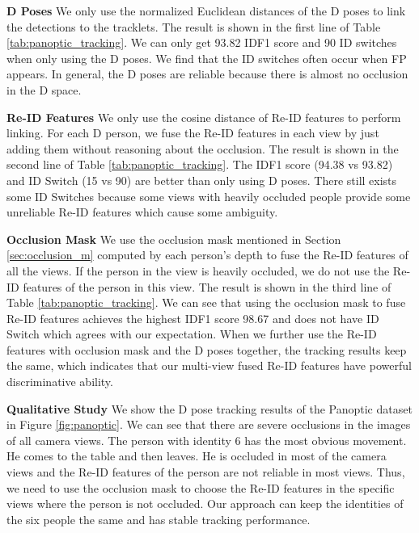 \vspace{0.5em}
\noindent
\textbf{D Poses }
We only use the normalized Euclidean distances of the D poses to link the detections to the tracklets. The result is shown in the first line of Table \ref{tab:panoptic_tracking}. We can only get 93.82 IDF1 score and 90 ID switches when only using the D poses. We find that the ID switches often occur when FP appears. In general, the D poses are reliable because there is almost no occlusion in the D space.   

\vspace{0.5em}
\noindent
\textbf{Re-ID Features }
We only use the cosine distance of Re-ID features to perform linking. For each D person, we fuse the Re-ID features in each view by just adding them without reasoning about the occlusion. The result is shown in the second line of Table \ref{tab:panoptic_tracking}. The IDF1 score (94.38 vs 93.82) and ID Switch (15 vs 90) are better than only using D poses. There still exists some ID Switches because some views with heavily occluded people provide some unreliable Re-ID features which cause some ambiguity.

\vspace{0.5em}
\noindent
\textbf{Occlusion Mask}
We use the occlusion mask mentioned in Section \ref{sec:occlusion_m} computed by each person's depth to fuse the Re-ID features of all the views. If the person in the view is heavily occluded, we do not use the Re-ID features of the person in this view. The result is shown in the third line of Table \ref{tab:panoptic_tracking}. We can see that using the occlusion mask to fuse Re-ID features achieves the highest IDF1 score 98.67 and does not have ID Switch which agrees with our expectation. When we further use the Re-ID features with occlusion mask and the D poses together, the tracking results keep the same, which indicates that our multi-view fused Re-ID features have powerful discriminative ability.  

\vspace{0.5em}
\noindent
\textbf{Qualitative Study }
We show the D pose tracking results of the Panoptic dataset in Figure \ref{fig:panoptic}. We can see that there are severe occlusions in the images of all camera views. The person with identity 6 has the most obvious movement. He comes to the table and then leaves. He is occluded in most of the camera views and the Re-ID features of the person are not reliable in most views. Thus, we need to use the occlusion mask to choose the Re-ID features in the specific views where the person is not occluded. Our approach can keep the identities of the six people the same and has stable tracking performance.  


